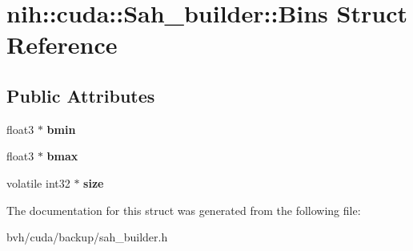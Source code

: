 \hypertarget{structnih_1_1cuda_1_1_sah__builder_1_1_bins}{
\section{nih\-:\-:cuda\-:\-:\-Sah\-\_\-builder\-:\-:\-Bins \-Struct \-Reference}
\label{structnih_1_1cuda_1_1_sah__builder_1_1_bins}
}
\subsection*{\-Public \-Attributes}
\begin{DoxyCompactItemize}
\item 
\hypertarget{structnih_1_1cuda_1_1_sah__builder_1_1_bins_a6845d66cf1473f8ff732fb7ad1014fa3}{
float3 $\ast$ {\bfseries bmin}}
\label{structnih_1_1cuda_1_1_sah__builder_1_1_bins_a6845d66cf1473f8ff732fb7ad1014fa3}

\item 
\hypertarget{structnih_1_1cuda_1_1_sah__builder_1_1_bins_a91edfaf7b718dc0a34cb3e6a302c92e7}{
float3 $\ast$ {\bfseries bmax}}
\label{structnih_1_1cuda_1_1_sah__builder_1_1_bins_a91edfaf7b718dc0a34cb3e6a302c92e7}

\item 
\hypertarget{structnih_1_1cuda_1_1_sah__builder_1_1_bins_a85acf005f8b3611c6cfdaa95162591f0}{
volatile int32 $\ast$ {\bfseries size}}
\label{structnih_1_1cuda_1_1_sah__builder_1_1_bins_a85acf005f8b3611c6cfdaa95162591f0}

\end{DoxyCompactItemize}


\-The documentation for this struct was generated from the following file\-:\begin{DoxyCompactItemize}
\item 
bvh/cuda/backup/sah\-\_\-builder.\-h\end{DoxyCompactItemize}
